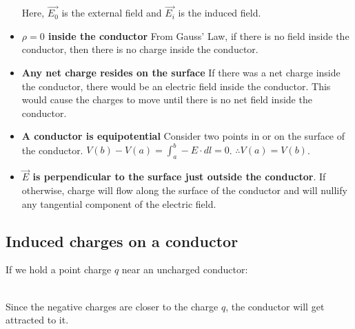 \documentclass{article}
\begin{document}
\begin{itemize}
\begin{tikzpicture}
        \end{tikzpicture}
        
        Here, $\vec{E_0}$ is the external field and $\vec{E_i}$ is the induced field.
        \item \textbf{$\rho = 0$ inside the conductor} From Gauss' Law, if there is no field inside the conductor, then there is no charge inside the conductor.
        \item \textbf{Any net charge resides on the surface} If there was a net charge inside the conductor, there would be an electric field inside the conductor. This would cause the charges to move until there is no net field inside the conductor.
        \item \textbf{A conductor is equipotential} Consider two points in or on the surface of the conductor. \(V(b) - V(a) = \int_{a}^{b}-E\cdot dl = 0\). $\therefore V(a) = V(b)$.
        \item \textbf{$\vec{E}$ is perpendicular to the surface just outside the conductor}. If otherwise, charge will flow along the surface of the conductor and will nullify any tangential component of the electric field.
\end{itemize}

\subsection{Induced charges on a conductor} 
If we hold a point charge $q$ near an uncharged conductor: \\

\\

Since the negative charges are closer to the charge $q$, the conductor will get attracted to it. 
\end{document}
